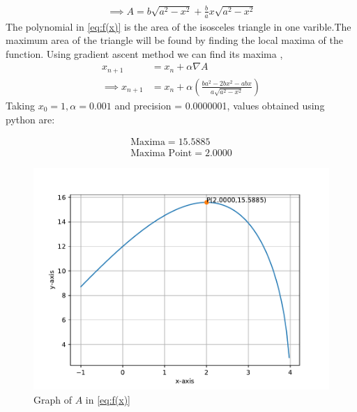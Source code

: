 \documentclass[journal,10pt,twocolumn]{article}
\providecommand{\brak}[1]{\ensuremath{\left(#1\right)}}
\begin{document}
\begin{align}
\implies A = b\sqrt{a^2-x^2} + \frac{b}{a}x\sqrt{a^2-x^2}
	\label{eq:f(x)}
\end{align}
The polynomial in \eqref{eq:f(x)} is the area of the isosceles triangle in one varible.The maximum area of the triangle will be found by finding the local maxima of the function.
Using gradient ascent method we can find its maxima ,
    \begin{align}
        x_{n+1} &= x_n + \alpha \nabla A \\
	    \implies x_{n+1} &= x_n + \alpha \brak{\frac{ba^2-2bx^2-abx}{a\sqrt{a^2-x^2}}}
    \end{align}
Taking $x_0=1,\alpha=0.001$ and precision = 0.0000001, values obtained using python are:
    
    \begin{align}
        \boxed{\text{Maxima} = 15.5885}\\
        \boxed{\text{Maxima Point} = 2.0000}
    \end{align}

\begin{figure}[t]
	\centering
	\includegraphics[width=1\columnwidth]{fig1.pdf}
	\caption{Graph of $A$ in \eqref{eq:f(x)}}
	\label{fig:graph_fx}
\end{figure}
\end{document}
